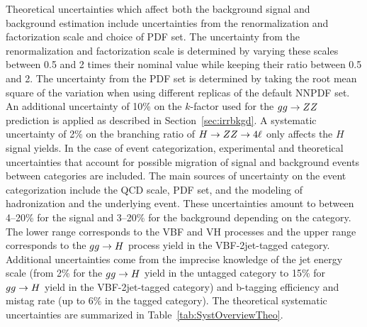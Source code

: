 Theoretical uncertainties which affect both the background signal and background estimation 
include uncertainties from the renormalization and factorization scale and choice of PDF set. 
The uncertainty from the renormalization and factorization scale is determined by varying these scales between 
0.5 and 2 times their nominal value while keeping their ratio between 0.5 and 2. 
The uncertainty from the PDF set is determined 
by taking the root mean square of the variation when using different replicas of the default NNPDF set. An additional
uncertainty of 10\% on the $k$-factor used for the $gg\to ZZ$ prediction is applied as described in Section~\ref{sec:irrbkgd}.
A systematic uncertainty of 2\% on the branching ratio of $H\to ZZ\to4\ell$ only affects the $H$ signal yields. 
In the case of event categorization, experimental and theoretical uncertainties that account for
possible migration of signal and background events between categories are included. The main sources 
of uncertainty on the event categorization include the QCD scale, PDF set, and the modeling of hadronization and the underlying 
event. These uncertainties amount to between 4--20\% for the signal and 3--20\% for the background depending on the category.
The lower range corresponds to the VBF and VH processes and the upper range corresponds to the $gg\to H$ process yield in the VBF-2jet-tagged category. 
Additional uncertainties come from the imprecise knowledge of the jet energy scale (from 2\% for the $gg\to H$ yield in the untagged category to 15\% for  $gg\to H$ yield in the VBF-2jet-tagged category) and b-tagging efficiency and mistag 
rate (up to 6\% in the tagged category). The theoretical systematic uncertainties are summarized in Table~\ref{tab:SystOverviewTheo}.


